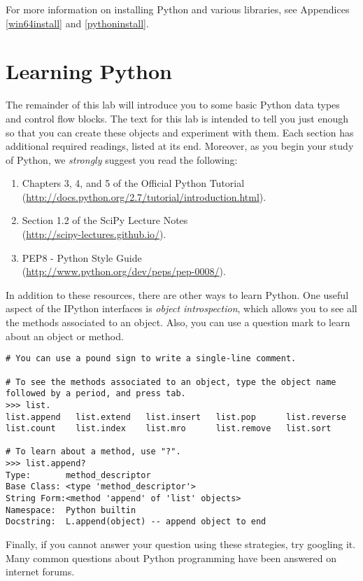 For more information on installing Python and various libraries, see Appendices \ref{win64install} and \ref{pythoninstall}.


\section*{Learning Python}
The remainder of this lab will introduce you to some basic Python data types and control flow blocks. The text for this lab is intended to tell you just enough so that you can create these objects and experiment with them. Each section has additional required readings, listed at its end. Moreover, as you begin your study of Python, we \emph{strongly} suggest you read the following:
\begin{enumerate}
\item Chapters 3, 4, and 5 of the Official Python Tutorial \\
        (\url{http://docs.python.org/2.7/tutorial/introduction.html}).
\item Section 1.2 of the SciPy Lecture Notes\\
        (\url{http://scipy-lectures.github.io/}).
\item PEP8 - Python Style Guide \\
        (\url{http://www.python.org/dev/peps/pep-0008/}).
\end{enumerate}

In addition to these resources, there are other ways to learn Python. One useful aspect of the IPython interfaces is \emph{object introspection}, which allows you to see all the methods associated to an object. Also, you can use a question mark to learn about an object or method.

\begin{lstlisting}
# You can use a pound sign to write a single-line comment.

# To see the methods associated to an object, type the object name followed by a period, and press tab.
>>> list.
list.append   list.extend   list.insert   list.pop      list.reverse  
list.count    list.index    list.mro      list.remove   list.sort

# To learn about a method, use "?".
>>> list.append?
Type:       method_descriptor
Base Class: <type 'method_descriptor'>
String Form:<method 'append' of 'list' objects>
Namespace:  Python builtin
Docstring:  L.append(object) -- append object to end
\end{lstlisting}

Finally, if you cannot answer your question using these strategies, try googling it. Many common questions about Python programming have been answered on internet forums.

